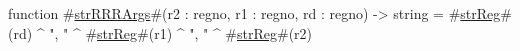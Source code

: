 function #\hyperref[sailMIPSzstrRRRArgs]{strRRRArgs}#(r2 : regno, r1 : regno, rd : regno) -> string = #\hyperref[sailMIPSzstrReg]{strReg}#(rd) ^ ", " ^ #\hyperref[sailMIPSzstrReg]{strReg}#(r1) ^ ", " ^ #\hyperref[sailMIPSzstrReg]{strReg}#(r2)
